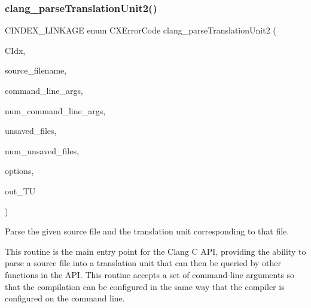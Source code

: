 \subsubsection{\texorpdfstring{clang\+\_\+parse\+Translation\+Unit2()}{clang\_parseTranslationUnit2()}}
{\footnotesize\ttfamily C\+I\+N\+D\+E\+X\+\_\+\+L\+I\+N\+K\+A\+GE enum C\+X\+Error\+Code clang\+\_\+parse\+Translation\+Unit2 (\begin{DoxyParamCaption}\item[{\hyperlink{group__CINDEX_gae039c2574bfd75774ca7a9a3e55910cb}{C\+X\+Index}}]{C\+Idx,  }\item[{const char $\ast$}]{source\+\_\+filename,  }\item[{const char $\ast$const $\ast$}]{command\+\_\+line\+\_\+args,  }\item[{int}]{num\+\_\+command\+\_\+line\+\_\+args,  }\item[{struct \hyperlink{structCXUnsavedFile}{C\+X\+Unsaved\+File} $\ast$}]{unsaved\+\_\+files,  }\item[{unsigned}]{num\+\_\+unsaved\+\_\+files,  }\item[{unsigned}]{options,  }\item[{\hyperlink{group__CINDEX_gacdb7815736ca709ce9a5e1ec2b7e16ac}{C\+X\+Translation\+Unit} $\ast$}]{out\+\_\+\+TU }\end{DoxyParamCaption})}



Parse the given source file and the translation unit corresponding to that file. 

This routine is the main entry point for the Clang C A\+PI, providing the ability to parse a source file into a translation unit that can then be queried by other functions in the A\+PI. This routine accepts a set of command-\/line arguments so that the compilation can be configured in the same way that the compiler is configured on the command line.


